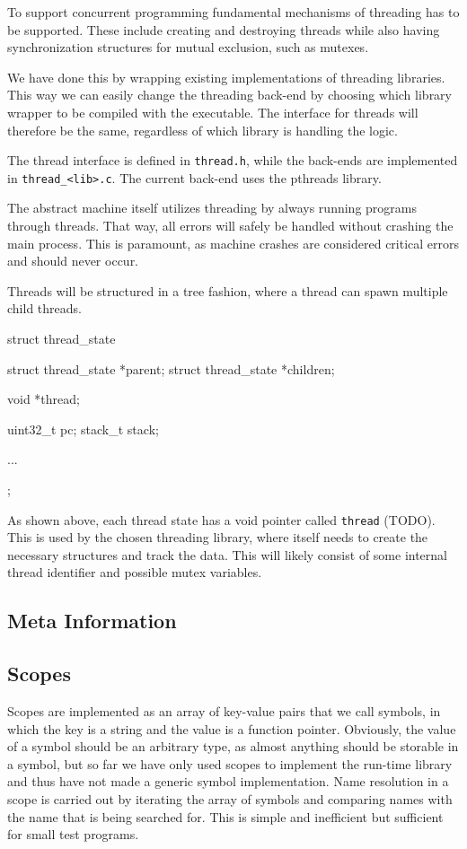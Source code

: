 To support concurrent programming fundamental mechanisms of threading has to be
supported. These include creating and destroying threads while also having
synchronization structures for mutual exclusion, such as mutexes.

We have done this by wrapping existing implementations of threading
libraries. This way we can easily change the threading back-end by choosing
which library wrapper to be compiled with the executable. The interface for
threads will therefore be the same, regardless of which library is handling the
logic.

The thread interface is defined in {\tt thread.h}, while the back-ends are
implemented in {\tt thread\_<lib>.c}. The current back-end uses the pthreads
library.

The abstract machine itself utilizes threading by always running programs
through threads. That way, all errors will safely be handled without crashing
the main process. This is paramount, as machine crashes are considered critical
errors and should never occur.

Threads will be structured in a tree fashion, where a thread can spawn multiple
child threads.
\begin{ccode}
struct thread_state {
    struct thread_state *parent;
    struct thread_state *children;

    void *thread;

    uint32_t pc;
    stack_t stack;

    ...
};
\end{ccode}

As shown above, each thread state has a void pointer called {\tt thread}
(TODO). This is used by the chosen threading library, where itself needs to
create the necessary structures and track the data. This will likely consist of
some internal thread identifier and possible mutex variables.

\subsection{Meta Information}
\label{sec:implementation:meta}


\subsection{Scopes}

Scopes are implemented as an array of key-value pairs that we call symbols, in
which the key is a string and the value is a function pointer. Obviously, the
value of a symbol should be an arbitrary type, as almost anything should be
storable in a symbol, but so far we have only used scopes to implement the
run-time library and thus have not made a generic symbol implementation. Name
resolution in a scope is carried out by iterating the array of symbols and
comparing names with the name that is being searched for. This is simple and
inefficient but sufficient for small test programs.

